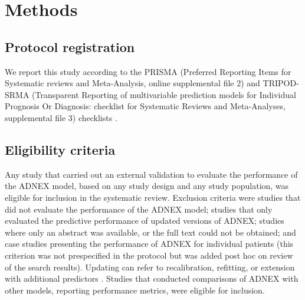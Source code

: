\section{Methods}

\subsection{Protocol registration}
We report this study according to the \gls{PRISMA} (Preferred Reporting Items for
Systematic reviews and Meta-Analysis, online supplemental file 2) and \gls{TRIPOD}-SRMA (Transparent Reporting of
multivariable prediction models for Individual Prognosis Or Diagnosis: checklist
for Systematic Reviews and Meta-Analyses, supplemental file 3) checklists
 \cite{snellTransparentReportingMultivariable2023,
pagePRISMA2020Statement2021}.

\subsection{Eligibility criteria}
Any study that carried out an external validation to evaluate the performance of the ADNEX model, based on any study design and any study population, was eligible for inclusion in the systematic review. Exclusion criteria were studies that did not evaluate the performance of the ADNEX model; studies that only evaluated the predictive performance of updated versions of ADNEX; studies where only an abstract was available, or the full text could not be obtained; and case studies presenting the performance of ADNEX for individual patients (this criterion was not prespecified in the protocol but was added post hoc on review of the search results). Updating can refer to recalibration, refitting, or extension with additional predictors
 \cite{steyerbergClinicalPredictionModels2009}. Studies that conducted comparisons of ADNEX with other models, reporting performance metrics, were eligible for inclusion.

